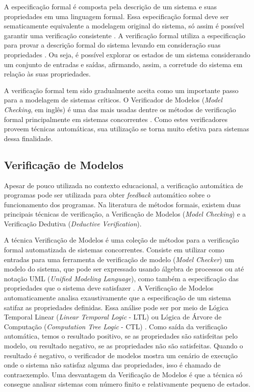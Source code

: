 A especificação formal é composta pela descrição de um sistema e suas propriedades em uma linguagem formal. Essa especificação formal deve ser sematicamente equivalente a modelagem original do sistema, só assim é possível garantir uma verificação consistente \cite{gannon}. A verificação formal utiliza a especificação para provar a descrição formal do sistema levando em consideração suas propriedades \cite{rui_silva}. Ou seja, é possível explorar os estados de um sistema considerando um conjunto de entradas e saídas, afirmando, assim, a corretude do sistema em relação às suas propriedades.

A verificação formal tem sido gradualmente aceita como um importante passo para a modelagem de sistemas críticos. O Verificador de Modelos (\textit{Model Checking}, em inglês) é uma das mais usadas dentre os métodos de verificação formal principalmente em sistemas concorrentes \cite{ZHAO2014}. Como estes verificadores proveem técnicas automáticas, sua utilização se torna muito efetiva para sistemas dessa finalidade.

\subsection{Verificação de Modelos}

Apesar de pouco utilizada no contexto educacional, a verificação automática de programas pode ser utilizada para obter \textit{feedback} automático sobre o funcionamento dos programas. Na literatura de métodos formais, existem duas principais técnicas de verificação, a Verificação de Modelos (\textit{Model Checking}) e a Verificação Dedutiva (\textit{Deductive Verification}). 

A técnica Verificação de Modelos é uma coleção de métodos para a verificação formal automatizada de sistemas concorrentes.  Consiste em utilizar como entradas para uma ferramenta de verificação de modelo (\textit{Model Checker}) um modelo do sistema, que pode ser expressado usando álgebra de processos ou até notação UML (\textit{Unified Modeling Language}), como também a especificação das propriedades que o sistema deve satisfazer \cite{FEIGN}. A Verificação de Modelos automaticamente analisa exaustivamente que a especificação de um sistema satifaz as propriedades definidas. Essa análise pode ser por meio de Lógica Temporal Linear (\textit{Linear Temporal Logic} - LTL) ou Lógica de Árvore de Computação (\textit{Computation Tree Logic} - CTL) \cite{ZHAO2014}. Como saída da verificação automática, temos o resultado positivo, se as propriedades são satisfeitas pelo modelo, ou resultado negativo, se as propriedades não são satisfeitas. Quando o resultado é negativo, o verificador de modelos mostra um cenário de execução onde o sistema não satisfaz alguma das propriedades, isso é chamado de contraexemplo. Uma desvantagem da Verificação de Modelos é que a técnica só consegue analisar sistemas com número finito e relativamente pequeno de estados. 

